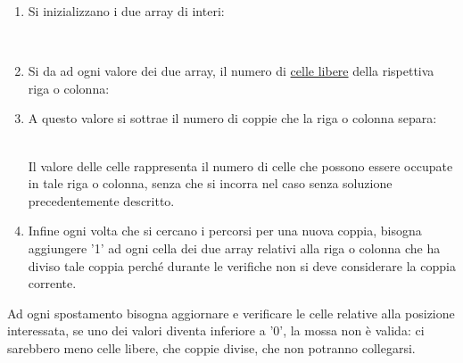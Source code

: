 \documentclass[11pt,a4paper,twocolumn]{IEEEtran}
\newcommand{\mysvg}[2]{}
\begin{document}
	\begin{enumerate}
		\item Si inizializzano i due array di interi:\\
		\begin{figure}[h]
			\vspace*{-.4cm}
			\centering
			\mysvg{expc/pcontrol1}{6}
		\end{figure}\\
		\vspace{-.5cm}
		\item Si da ad ogni valore dei due array, il numero di \underline{celle libere} della rispettiva riga o colonna:
		
		\begin{figure}[h]
			\vspace*{.0cm}
			\centering
			\mysvg{expc/pcontrol2}{6}
		\end{figure}
		\item A questo valore si sottrae il numero di coppie che la riga o colonna separa:
		\begin{figure}[h]
			\vspace*{.0cm}
			\centering
			\mysvg{expc/pcontrol3}{6}
		\end{figure}\\
		Il valore delle celle rappresenta il numero di celle che possono essere occupate in tale riga o colonna, senza che si incorra nel caso senza soluzione precedentemente descritto.\medskip\\
		\item Infine ogni volta che si cercano i percorsi per una nuova coppia, bisogna aggiungere '1' ad ogni cella dei due array relativi alla riga o colonna che ha diviso tale coppia perché durante le verifiche non si deve considerare la coppia corrente.
	\end{enumerate}
	Ad ogni spostamento bisogna aggiornare e verificare le celle relative alla posizione interessata, se uno dei valori diventa inferiore a '0', la mossa  non è valida: ci sarebbero meno celle libere, che coppie divise, che non potranno collegarsi.
		
	\iftrue
\end{document}
